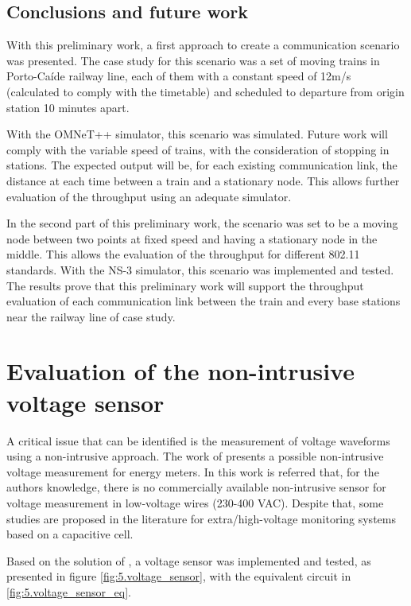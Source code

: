 \subsection{Conclusions and future work}

	With this preliminary work, a first approach to create a communication scenario was presented. 
	The case study for this scenario was a set of moving trains in Porto-Caíde railway line, each of them with a constant speed of 12m/s (calculated to comply with the timetable) and scheduled to departure from origin station 10 minutes apart.
	
	With the OMNeT++ simulator, this scenario was simulated. Future work will comply with the variable speed of trains, with the consideration of stopping in stations. The expected output will be, for each existing communication link, the distance at each time between a train and a stationary node. This allows further evaluation of the throughput using an adequate simulator.
	
	In the second part of this preliminary work, the scenario was set to be a moving node between two points at fixed speed and having a stationary node in the middle. This allows the evaluation of the throughput for different 802.11 standards. With the NS-3 simulator, this scenario was implemented and tested. The results prove that this preliminary work will support the throughput evaluation of each communication link between the train and every base stations near the railway line of case study.

\section{Evaluation of the non-intrusive voltage sensor}

	A critical issue that can be identified is the measurement of voltage waveforms using a non-intrusive approach. 
	The work of \cite{brunelli2016} presents a possible non-intrusive voltage measurement for energy meters.
	In this work is referred that, for the authors knowledge, there is no commercially available non-intrusive sensor for voltage measurement in low-voltage wires (230-400 VAC). 
	Despite that, some studies are proposed in the literature for extra/high-voltage monitoring systems based on a capacitive cell.
	
	Based on the solution of \cite{brunelli2016}, a voltage sensor was implemented and tested, as presented in figure \ref{fig:5.voltage_sensor}, with the equivalent circuit in \ref{fig:5.voltage_sensor_eq}. 
	
